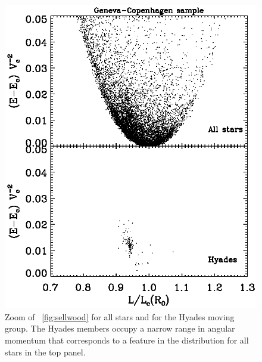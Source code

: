 \clearpage
\begin{figure}
\begin{center}
\includegraphics{figs_groups/sellwood_gcs_hyades.ps}
\end{center}
\caption[Zoom of \figurename~\ref{fig:sellwood} for all stars and for
  the Hyades moving group]{Zoom of \figurename~\ref{fig:sellwood} for
  all stars and for the Hyades moving group. The Hyades members occupy
  a narrow range in angular momentum that corresponds to a feature in
  the distribution for all stars in the top
  panel.}\label{fig:sellwood_hyades}
\end{figure}
